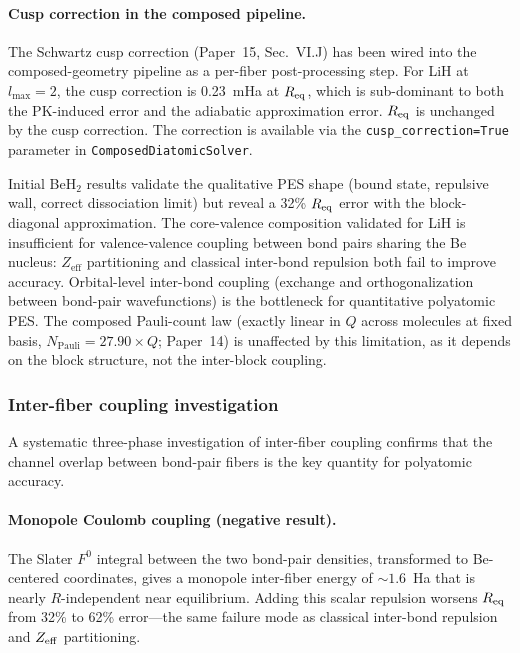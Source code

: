 \documentclass[aps,pra,twocolumn,superscriptaddress,longbibliography,floatfix]{revtex4-2}
\begin{document}
\paragraph{Cusp correction in the composed pipeline.}
The Schwartz cusp correction (Paper~15, Sec.~VI.J) has been
wired into the composed-geometry pipeline as a per-fiber
post-processing step.  For LiH at $l_{\max} = 2$, the cusp
correction is 0.23~mHa at $R_{\rm eq}$, which is sub-dominant
to both the PK-induced error and the adiabatic approximation error.
$R_{\rm eq}$ is unchanged by the cusp correction.  The correction
is available via the \texttt{cusp\_correction=True} parameter in
\texttt{ComposedDiatomicSolver}.

Initial BeH$_2$ results validate the qualitative PES shape (bound state,
repulsive wall, correct dissociation limit) but reveal a 32\%
$R_{\rm eq}$ error with the block-diagonal approximation.  The
core-valence composition validated for LiH is insufficient for
valence-valence coupling between bond pairs sharing the Be nucleus:
$Z_{\mathrm{eff}}$ partitioning and classical inter-bond repulsion both
fail to improve accuracy.  Orbital-level inter-bond coupling (exchange
and orthogonalization between bond-pair wavefunctions) is the bottleneck
for quantitative polyatomic PES.  The composed Pauli-count law
(exactly linear in $Q$ across molecules at fixed basis,
$N_{\mathrm{Pauli}} = 27.90 \times Q$; Paper~14) is unaffected by
this limitation, as
it depends on the block structure, not the inter-block coupling.

\subsubsection{Inter-fiber coupling investigation}

A systematic three-phase investigation of inter-fiber coupling confirms
that the channel overlap between bond-pair fibers is the key quantity
for polyatomic accuracy.

\paragraph{Monopole Coulomb coupling (negative result).}
The Slater $F^0$ integral between the two bond-pair densities,
transformed to Be-centered coordinates, gives a monopole inter-fiber
energy of ${\sim}1.6$~Ha that is nearly $R$-independent near
equilibrium.  Adding this scalar repulsion worsens $R_{\rm eq}$ from
32\% to 62\% error---the same failure mode as classical inter-bond
repulsion and $Z_{\rm eff}$ partitioning.
\end{document}
